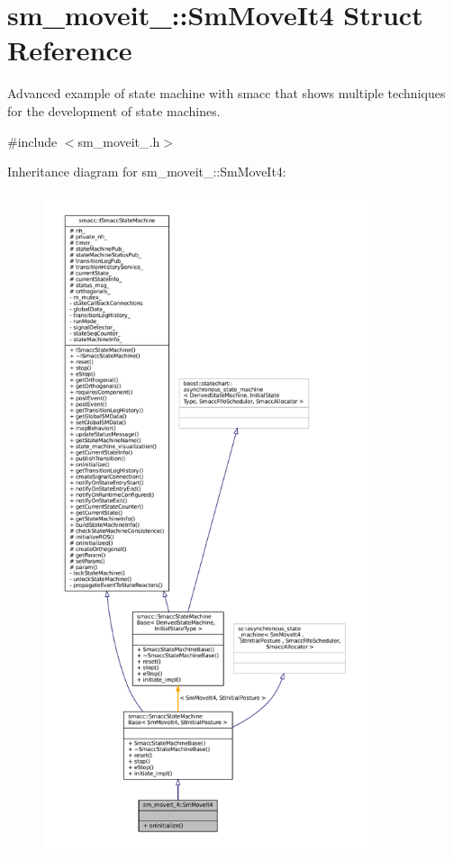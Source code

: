 \hypertarget{structsm__moveit__4_1_1SmMoveIt4}{}\section{sm\+\_\+moveit\+\_\+:\+:Sm\+Move\+It4 Struct Reference}
\label{structsm__moveit__4_1_1SmMoveIt4}


Advanced example of state machine with smacc that shows multiple techniques for the development of state machines.  




{\ttfamily \#include $<$sm\+\_\+moveit\+\_.\+h$>$}



Inheritance diagram for sm\+\_\+moveit\+\_\+:\+:Sm\+Move\+It4\+:
\nopagebreak
\begin{figure}[H]
\begin{center}
\leavevmode
\includegraphics[height=550pt]{structsm__moveit__4_1_1SmMoveIt4__inherit__graph}
\end{center}
\end{figure}


